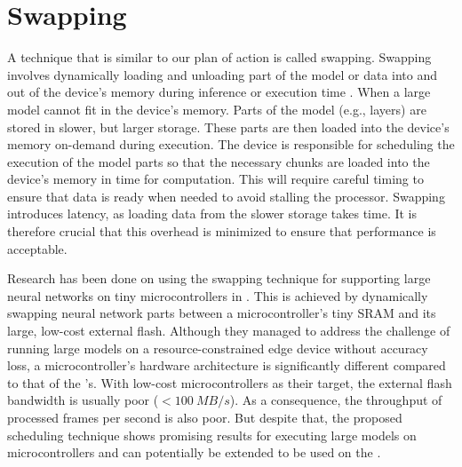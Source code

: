 \section{Swapping}

A technique that is similar to our plan of action is called swapping.
Swapping involves dynamically loading and unloading part of the model or data into and out of the device’s memory during inference or execution time \cite{wangSwapNetEfficientSwapping2024, huangSwapAdvisorPushingDeep2020}.
\cite{wang_swapnet_2024, huang_swapadvisor_2020}
When a large model cannot fit in the device’s memory. Parts of the model (e.g., layers) are stored in slower, but larger storage.
These parts are then loaded into the device’s memory on-demand during execution.
The device is responsible for scheduling the execution of the model parts so that the necessary chunks are loaded into the device’s memory in time for computation.
This will require careful timing to ensure that data is ready when needed to avoid stalling the processor.
Swapping introduces latency, as loading data from the slower storage takes time.
It is therefore crucial that this overhead is minimized to ensure that performance is acceptable.

Research has been done on using the swapping technique for supporting large neural networks on tiny microcontrollers in \cite{miaoEnablingLargeNeural2021}.
This is achieved by dynamically swapping neural network parts between a microcontroller's tiny SRAM and its large, low-cost external flash.
Although they managed to address the challenge of running large models on a resource-constrained edge device without accuracy loss, a microcontroller's hardware architecture is significantly different compared to that of the \graicore{}'s.
With low-cost microcontrollers as their target, the external flash bandwidth is usually poor ($<\SI{100}{MB/s}$).
As a consequence, the throughput of processed frames per second is also poor.
But despite that, the proposed scheduling technique shows promising results for executing large models on microcontrollers and can potentially be extended to be used on the \graicore{}.

